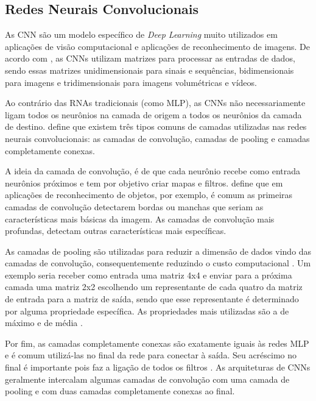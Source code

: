 \subsection{Redes Neurais Convolucionais}
\label{subsecao:2:3:1}


As \ac{CNN} são um modelo específico de \textit{Deep Learning} muito utilizados em aplicações de visão computacional e aplicações de reconhecimento de imagens. De acordo com , as \ac{CNN}s utilizam matrizes para processar as entradas de dados, sendo essas matrizes unidimensionais para sinais e sequências, bidimensionais para imagens e tridimensionais para imagens volumétricas e vídeos. 

Ao contrário das \ac{RNA}s tradicionais (como \ac{MLP}), as \ac{CNN}s não necessariamente ligam todos os neurônios na camada de origem a todos os neurônios da camada de destino.  define que existem três tipos comuns de camadas utilizadas nas redes neurais convolucionais: as camadas de convolução, camadas de pooling e camadas completamente conexas.

A ideia da camada de convolução, é de que cada neurônio recebe como entrada neurônios próximos e tem por objetivo criar mapas e filtros.  define que em aplicações de reconhecimento de objetos, por exemplo, é comum as primeiras camadas de convolução detectarem bordas ou manchas que seriam as características mais básicas da imagem. As camadas de convolução mais profundas, detectam outras características mais específicas.

As camadas de pooling são utilizadas para reduzir a dimensão de dados vindo das camadas de convolução, consequentemente reduzindo o custo computacional \cite{ferreira-2017}. Um exemplo seria receber como entrada uma matriz 4x4 e enviar para a próxima camada uma matriz 2x2 escolhendo um representante de cada quatro da matriz de entrada para a matriz de saída, sendo que esse representante é determinado por alguma propriedade específica. As propriedades mais utilizadas são a de máximo e de média \cite{ferreira-2017}.

Por fim, as camadas completamente conexas são exatamente iguais às redes MLP e é comum utilizá-las no final da rede para conectar à saída. Seu acréscimo no final é importante pois faz a ligação de todos os filtros \cite{ferreira-2017}. As arquiteturas de \ac{CNN}s geralmente intercalam algumas camadas de convolução com uma camada de pooling e com duas camadas completamente conexas ao final.

